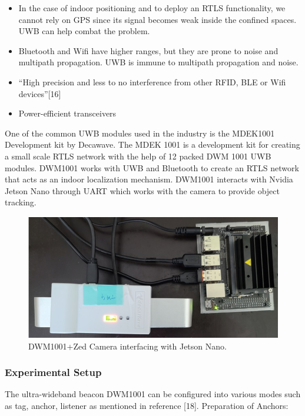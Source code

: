 \documentclass{IEEEtran}
\begin{document}
\begin{itemize}
\item In the case of indoor positioning and to deploy an RTLS functionality, we cannot rely on GPS since its signal becomes weak inside the confined spaces. UWB can help combat the problem.
\item Bluetooth and Wifi have higher ranges, but they are prone to noise and multipath propagation. UWB is immune to multipath propagation and noise.
\item “High precision and less to no interference from other RFID, BLE or Wifi devices”[16]
\item Power-efficient transceivers
\end{itemize}

One of the common UWB modules used in the industry is the MDEK1001 Development kit by Decawave. The MDEK 1001 is a development kit for creating a small scale RTLS network with the help of 12 packed DWM 1001 UWB modules. DWM1001 works with UWB and Bluetooth to create an RTLS network that acts as an indoor localization mechanism. DWM1001 interacts with Nvidia Jetson Nano through UART which works with the camera to provide object tracking.

\begin{figure}[htb]
\centering
\includegraphics[width=1\linewidth]{fig/DWM_tag_setup.jpg}
\caption{DWM1001+Zed Camera interfacing with Jetson Nano.} \label{fig.structure}
\end{figure}

\subsubsection{Experimental Setup}
The ultra-wideband beacon DWM1001 can be configured into various modes such as tag, anchor, listener as mentioned in reference  [18].
\newline
Preparation of Anchors:
\end{document}
